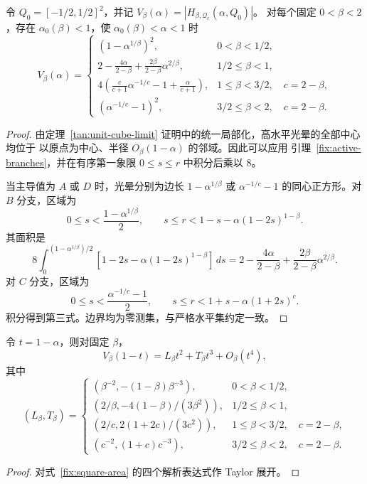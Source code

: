 \begin{theorem}[单位正方形的高水平精确面积]\label{fix:square-exact}
令 $Q_0=[-1/2,1/2]^2$，并记
$V_\beta(\alpha)=|H_{\beta,\mathcal Q_c}(\alpha,Q_0)|$。
对每个固定 $0<\beta<2$，存在 $\alpha_0(\beta)<1$，使
$\alpha_0(\beta)<\alpha<1$ 时
\begin{equation}\label{fix:square-area}
 V_\beta(\alpha)=
 \begin{cases}
 (1-\alpha^{1/\beta})^2,&0<\beta<1/2,\\[2pt]
 \displaystyle 2-\frac{4\alpha}{2-\beta}
       +\frac{2\beta}{2-\beta}\alpha^{2/\beta},&1/2\le\beta<1,\\[5pt]
 \displaystyle 4\left(\frac{c}{c+1}\alpha^{-1/c}-1
                    +\frac{\alpha}{c+1}\right),&1\le\beta<3/2,\quad c=2-\beta,\\[5pt]
 (\alpha^{-1/c}-1)^2,&3/2\le\beta<2,\quad c=2-\beta.
 \end{cases}
\end{equation}
\end{theorem}
\begin{proof}
由定理~\ref{tan:unit-cube-limit} 证明中的统一局部化，高水平光晕的全部中心均位于
以原点为中心、半径 $O_\beta(1-\alpha)$ 的邻域。因此可以应用
引理~\ref{fix:active-branches}，并在有序第一象限 $0\le s\le r$ 中积分后乘以 $8$。

当主导值为 $A$ 或 $D$ 时，光晕分别为边长 $1-\alpha^{1/\beta}$ 或
$\alpha^{-1/c}-1$ 的同心正方形。对 $B$ 分支，区域为
\[
 0\le s<\frac{1-\alpha^{1/\beta}}2,\qquad
 s\le r<1-s-\alpha(1-2s)^{1-\beta}.
\]
其面积是
\[
 8\int_0^{(1-\alpha^{1/\beta})/2}
 [1-2s-\alpha(1-2s)^{1-\beta}]\,ds
 =2-\frac{4\alpha}{2-\beta}+\frac{2\beta}{2-\beta}\alpha^{2/\beta}.
\]
对 $C$ 分支，区域为
\[
 0\le s<\frac{\alpha^{-1/c}-1}2,\qquad
 s\le r<1+s-\alpha(1+2s)^c.
\]
积分得到第三式。边界均为零测集，与严格水平集约定一致。
\end{proof}

\begin{corollary}[三阶面积渐近]\label{fix:cubic-area}
令 $t=1-\alpha$，则对固定 $\beta$，
\[
 V_\beta(1-t)=L_\beta t^2+T_\beta t^3+O_\beta(t^4),
\]
其中
\[
 (L_\beta,T_\beta)=
 \begin{cases}
 (\beta^{-2},-(1-\beta)\beta^{-3}),&0<\beta<1/2,\\[2pt]
 (2/\beta,-4(1-\beta)/(3\beta^2)),&1/2\le\beta<1,\\[2pt]
 (2/c,2(1+2c)/(3c^2)),&1\le\beta<3/2,\quad c=2-\beta,\\[2pt]
 (c^{-2},(1+c)c^{-3}),&3/2\le\beta<2,\quad c=2-\beta.
 \end{cases}
\]
\end{corollary}
\begin{proof}
对式~\eqref{fix:square-area} 的四个解析表达式作 Taylor 展开。
\end{proof}

